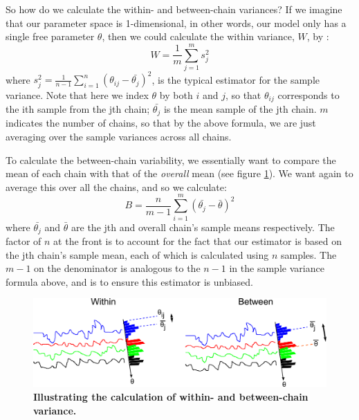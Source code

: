 \documentclass[11pt,fullpage]{book}
\begin{document}
So how do we calculate the within- and between-chain variances? If we imagine that our parameter space is 1-dimensional, in other words, our model only has a single free parameter $\theta$, then we could calculate the within variance, $W$, by \cite{gelman2013bayesian}:
%
\begin{equation}
W = \frac{1}{m}\sum\limits_{j=1}^{m} s_j^2
\end{equation}
%
where $s_j^2=\frac{1}{n-1}\sum\limits_{i=1}^{n} (\theta_{ij} - \bar{\theta_j})^2$, is the typical estimator for the sample variance. Note that here we index $\theta$ by both $i$ and $j$, so that $\theta_{ij}$ corresponds to the ith sample from the jth chain; $\bar{\theta_j}$ is the mean sample of the jth chain. $m$ indicates the number of chains, so that by the above formula, we are just averaging over the sample variances across all chains. 

To calculate the between-chain variability, we essentially want to compare the mean of each chain with that of the \textit{overall} mean (see figure \ref{fig:metropolisHastings_withinBetweenExplicit}). We want again to average this over all the chains, and so we calculate: 
%
\begin{equation}
B = \frac{n}{m-1}\sum\limits_{i=1}^{m}(\bar{\theta_j} - \bar{\theta})^2
\end{equation}
%
where $\bar{\theta_j}$ and $\bar{\theta}$ are the jth and overall chain's sample means respectively. The factor of $n$ at the front is to account for the fact that our estimator is based on the jth chain's sample mean, each of which is calculated using $n$ samples. The $m-1$ on the denominator is analogous to the $n-1$ in the sample variance formula above, and is to ensure this estimator is unbiased.

\begin{figure}
\centerline{\includegraphics[width=1\textwidth]{metropolisHastings_withinBetweenExplicit.pdf}}
\caption{\textbf{Illustrating the calculation of within- and between-chain variance.}}\label{fig:metropolisHastings_withinBetweenExplicit}
\end{figure}
\end{document}
